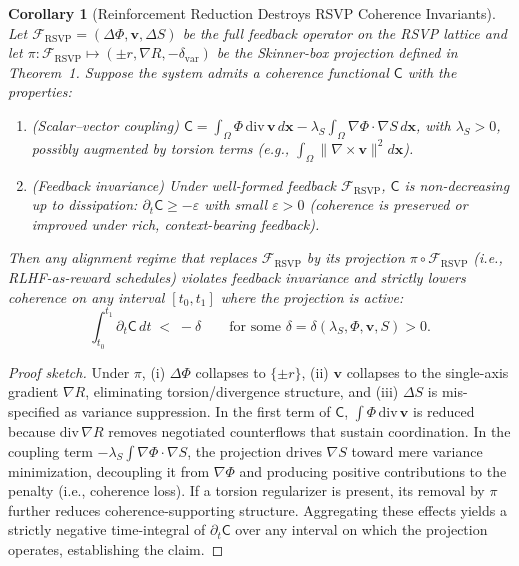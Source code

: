 \documentclass{article}
\newtheorem{corollary}{Corollary}
\begin{document}
\begin{corollary}[Reinforcement Reduction Destroys RSVP Coherence Invariants]
\label{cor:rlhf-coherence-destruction}
Let $\mathcal{F}_{\mathrm{RSVP}}=(\Delta \Phi,\mathbf{v},\Delta S)$ be the full
feedback operator on the RSVP lattice and let
$\pi:\mathcal{F}_{\mathrm{RSVP}}\mapsto(\pm r,\nabla R,-\delta_{\mathrm{var}})$
be the Skinner-box projection defined in Theorem~1. 
Suppose the system admits a coherence functional $\mathsf{C}$ with the properties:
\begin{enumerate}
\item (\emph{Scalar–vector coupling}) $\displaystyle 
\mathsf{C} = \int_\Omega \Phi\,\mathrm{div}\,\mathbf{v}\,d\mathbf{x}
- \lambda_S \int_\Omega \nabla \Phi \cdot \nabla S\,d\mathbf{x}$, 
with $\lambda_S>0$, possibly augmented by torsion terms 
(e.g., $\int_\Omega \|\nabla\times \mathbf{v}\|^2 d\mathbf{x}$).
\item (\emph{Feedback invariance}) Under well-formed feedback 
$\mathcal{F}_{\mathrm{RSVP}}$, $\mathsf{C}$ is non-decreasing up to dissipation:
$\partial_t \mathsf{C} \ge -\varepsilon$ with small $\varepsilon>0$ (coherence is
preserved or improved under rich, context-bearing feedback).
\end{enumerate}
Then any alignment regime that replaces $\mathcal{F}_{\mathrm{RSVP}}$ by its
projection $\pi\circ\mathcal{F}_{\mathrm{RSVP}}$ (i.e., RLHF-as-reward schedules)
violates feedback invariance and strictly lowers coherence on any interval
$[t_0,t_1]$ where the projection is active:
\[
\int_{t_0}^{t_1} \partial_t \mathsf{C}\,dt \;<\; -\delta
\qquad\text{for some } \delta=\delta(\lambda_S,\Phi,\mathbf{v},S)>0.
\]
\end{corollary}

\begin{proof}[Proof sketch]
Under $\pi$, (i) $\Delta\Phi$ collapses to $\{\pm r\}$,
(ii) $\mathbf{v}$ collapses to the single-axis gradient $\nabla R$, eliminating
torsion/divergence structure, and (iii) $\Delta S$ is mis-specified as variance
suppression. In the first term of $\mathsf{C}$,
$\int \Phi\,\mathrm{div}\,\mathbf{v}$ is reduced because $\mathrm{div}\,\nabla R$
removes negotiated counterflows that sustain coordination. In the coupling term
$-\lambda_S\int \nabla \Phi \cdot \nabla S$, the projection drives $\nabla S$
toward mere variance minimization, decoupling it from $\nabla \Phi$ and
producing positive contributions to the penalty (i.e., coherence loss). If a
torsion regularizer is present, its removal by $\pi$ further reduces
coherence-supporting structure. Aggregating these effects yields a strictly
negative time-integral of $\partial_t \mathsf{C}$ over any interval on which
the projection operates, establishing the claim.
\end{proof}
\end{document}
